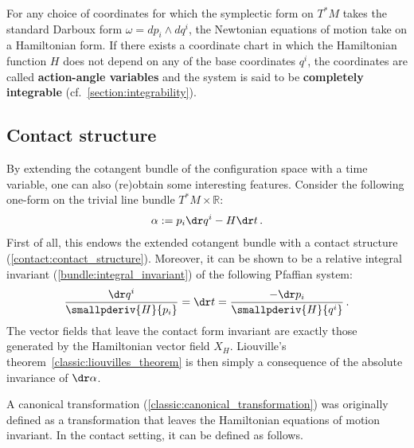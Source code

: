     For any choice of coordinates for which the symplectic form on $T^*M$ takes the standard Darboux form $\omega=dp_i\wedge dq^i$, the Newtonian equations of motion take on a Hamiltonian form. If there exists a coordinate chart in which the Hamiltonian function $H$ does not depend on any of the base coordinates $q^i$, the coordinates are called \textbf{action-angle variables} and the system is said to be \textbf{completely integrable} (cf.~\cref{section:integrability}).

\subsection{Contact structure}

    By extending the cotangent bundle of the configuration space with a time variable, one can also (re)obtain some interesting features. Consider the following one-form on the trivial line bundle $T^*M\times\mathbb{R}$:
    \begin{gather}
        \alpha := p_i\dr q^i - H\dr t\,.
    \end{gather}
    First of all, this endows the extended cotangent bundle with a contact structure (\cref{contact:contact_structure}). Moreover, it can be shown to be a relative integral invariant (\cref{bundle:integral_invariant}) of the following Pfaffian system:
    \begin{gather}
        \frac{\dr q^i}{\smallpderiv{H}{p_i}} = \dr t = \frac{-\dr p_i}{\smallpderiv{H}{q^i}}\,.
    \end{gather}
    The vector fields that leave the contact form invariant are exactly those generated by the Hamiltonian vector field $X_H$. Liouville's theorem~\ref{classic:liouvilles_theorem} is then simply a consequence of the absolute invariance of $\dr\alpha$.

    A canonical transformation (\cref{classic:canonical_transformation}) was originally defined as a transformation that leaves the Hamiltonian equations of motion invariant. In the contact setting, it can be defined as follows.
